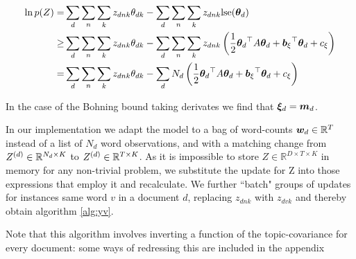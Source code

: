 \begin{align}
\ln p(Z) = & \sum_d \sum_n \sum_k { z_{dnk} } { \theta_{dk} } - \sum_d \sum_n \sum_k { z_{dnk} } \text{lse}({ \bm \theta_d }) \\
\geq & \sum_d \sum_n \sum_k { z_{dnk} } { \theta_{dk} } - \sum_d \sum_n \sum_k { z_{dnk} } \left( \frac{1}{2} { \bm \theta_d }^\top A { \bm \theta_d } + { \bm b_{\xi} }^\top{  \bm \theta _d } + { c_{\xi} } \right)\\
= & \sum_d \sum_n \sum_k { z_{dnk} } { \theta_{dk} } - \sum_d N_d \left( \frac{1}{2} { \bm \theta_d }^\top A { \bm \theta_d } + { \bm b_{\xi} }^\top{  \bm \theta _d } + { c_{\xi} } \right)
\end{align}

In the case of the Bohning bound taking derivates we find that ${ \bm \xi_d} = \bm m_d$.

In our implementation we adapt the model to a bag of word-counts $\bm w_d \in { \mathbb{R}^{T} }$ instead of a list of $N_d$ word observations, and with a matching change from $Z^{(d)} \in { \mathbb{R}^{N_d \times K} }$ to $Z^{(d)} \in { \mathbb{R}^{T \times K} }$. As it is impossible to store $Z \in \mathbb{R}^{D\times T \times K}$ in memory for any non-trivial problem, we substitute the update for Z into those expressions that employ it and recalculate. We further ``batch" groups of updates for instances same word $v$ in a document $d$, replacing $z_{dnk}$ with $z_{dvk}$ and thereby obtain algorithm \ref{alg:yv}.

Note that this algorithm involves inverting a function of the topic-covariance for every document: some ways of redressing this are included in the appendix


